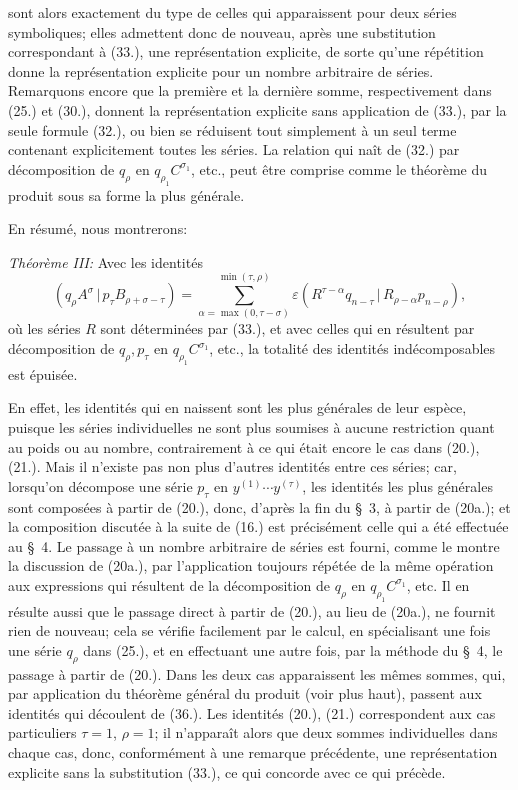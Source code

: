 \documentclass[11pt]{article}
\newcommand{\pair}[2]{(#1\,|\,#2)}
\newcommand{\eps}{\varepsilon}
\begin{document}
sont alors exactement du type de celles qui apparaissent pour deux séries symboliques; elles admettent donc de nouveau, après une substitution correspondant à (33.), une représentation explicite, de sorte qu'une répétition donne la représentation explicite pour un nombre arbitraire de séries. Remarquons encore que la première et la dernière somme, respectivement dans (25.) et (30.), donnent la représentation explicite sans application de (33.), par la seule formule (32.), ou bien se réduisent tout simplement à un seul terme contenant explicitement toutes les séries. La relation qui naît de (32.) par décomposition de $q_\rho$ en $q_{\rho_1}C^{\sigma_1}$, etc., peut être comprise comme le théorème du produit sous sa forme la plus générale.

En résumé, nous montrerons:

\emph{Théorème III:} Avec les identités
\begin{equation}
 \pair{q_\rho A^\sigma}{p_\tau B_{\rho+\sigma-\tau}}
 =\sum_{\alpha=\max(0,\tau-\sigma)}^{\min(\tau,\rho)}
 \eps\pair{R^{\tau-\alpha}q_{n-\tau}}{R_{\rho-\alpha}p_{n-\rho}},
\tag{36}
\end{equation}
où les séries $R$ sont déterminées par (33.), et avec celles qui en résultent par décomposition de $q_\rho,p_\tau$ en $q_{\rho_1}C^{\sigma_1}$, etc., la totalité des identités indécomposables est épuisée.

En effet, les identités qui en naissent sont les plus générales de leur espèce, puisque les séries individuelles ne sont plus soumises à aucune restriction quant au poids ou au nombre, contrairement à ce qui était encore le cas dans (20.), (21.). Mais il n'existe pas non plus d'autres identités entre ces séries; car, lorsqu'on décompose une série $p_\tau$ en $y^{(1)}\cdots y^{(\tau)}$, les identités les plus générales sont composées à partir de (20.), donc, d'après la fin du \S\ 3, à partir de (20a.); et la composition discutée à la suite de (16.) est précisément celle qui a été effectuée au \S\ 4. Le passage à un nombre arbitraire de séries est fourni, comme le montre la discussion de (20a.), par l'application toujours répétée de la même opération aux expressions qui résultent de la décomposition de $q_\rho$ en $q_{\rho_1}C^{\sigma_1}$, etc. Il en résulte aussi que le passage direct à partir de (20.), au lieu de (20a.), ne fournit rien de nouveau; cela se vérifie facilement par le calcul, en spécialisant une fois une série $q_\rho$ dans (25.), et en effectuant une autre fois, par la méthode du \S\ 4, le passage à partir de (20.). Dans les deux cas apparaissent les mêmes sommes, qui, par application du théorème général du produit (voir plus haut), passent aux identités qui découlent de (36.). Les identités (20.), (21.) correspondent aux cas particuliers $\tau=1$, $\rho=1$; il n'apparaît alors que deux sommes individuelles dans chaque cas, donc, conformément à une remarque précédente, une représentation explicite sans la substitution (33.), ce qui concorde avec ce qui précède.
\end{document}
